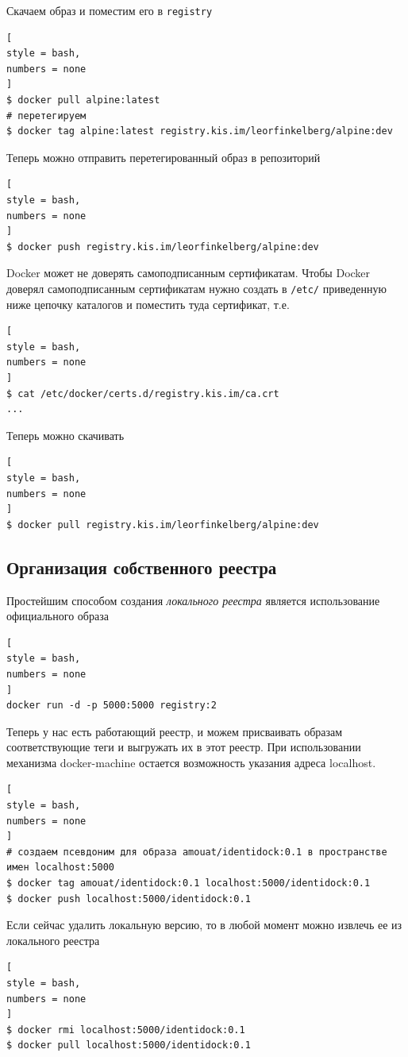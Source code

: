 \documentclass[%
	11pt,
	a4paper,
	utf8,
		]{article}
\begin{document}
Скачаем образ и поместим его в \texttt{registry}
\begin{lstlisting}[
style = bash,
numbers = none
]
$ docker pull alpine:latest
# перетегируем
$ docker tag alpine:latest registry.kis.im/leorfinkelberg/alpine:dev
\end{lstlisting}

Теперь можно отправить перетегированный образ в репозиторий
\begin{lstlisting}[
style = bash,
numbers = none
]
$ docker push registry.kis.im/leorfinkelberg/alpine:dev
\end{lstlisting}

Docker может не доверять самоподписанным сертификатам. Чтобы Docker доверял самоподписанным сертификатам нужно создать в \verb|/etc/| приведенную ниже цепочку каталогов и поместить туда сертификат, т.е.
\begin{lstlisting}[
style = bash,
numbers = none
]
$ cat /etc/docker/certs.d/registry.kis.im/ca.crt
...
\end{lstlisting}

Теперь можно скачивать
\begin{lstlisting}[
style = bash,
numbers = none
]
$ docker pull registry.kis.im/leorfinkelberg/alpine:dev
\end{lstlisting}

\subsection{Организация собственного реестра}

Простейшим способом создания \emph{локального реестра} является использование официального образа
\begin{lstlisting}[
style = bash,
numbers = none
]
docker run -d -p 5000:5000 registry:2
\end{lstlisting}

Теперь у нас есть работающий реестр, и можем присваивать образам соответствующие теги и выгружать их в этот реестр. При использовании механизма docker-machine остается возможность указания адреса localhost.
\begin{lstlisting}[
style = bash,
numbers = none
]
# создаем псевдоним для образа amouat/identidock:0.1 в пространстве имен localhost:5000
$ docker tag amouat/identidock:0.1 localhost:5000/identidock:0.1
$ docker push localhost:5000/identidock:0.1
\end{lstlisting}

Если сейчас удалить локальную версию, то в любой момент можно извлечь ее из локального реестра
\begin{lstlisting}[
style = bash,
numbers = none
]
$ docker rmi localhost:5000/identidock:0.1
$ docker pull localhost:5000/identidock:0.1
\end{lstlisting}
\end{document}
